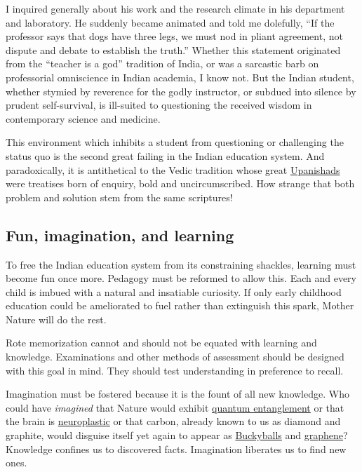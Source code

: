 \documentclass[
  12pt,
  british,
  a4paper,
  rgb,
  dvipsnames,
  svgnames,
  hyphens]{article}
\begin{document}
I inquired generally about his work and the research climate in his
department and laboratory. He suddenly became animated and told me
dolefully, ``If the professor says that dogs have three legs, we must
nod in pliant agreement, not dispute and debate to establish the
truth.'' Whether this statement originated from the ``teacher is a god''
tradition of India, or was a sarcastic barb on professorial omniscience
in Indian academia, I know not. But the Indian student, whether stymied
by reverence for the godly instructor, or subdued into silence by
prudent self-survival, is ill-suited to questioning the received wisdom
in contemporary science and medicine.

This environment which inhibits a student from questioning or
challenging the status quo is the second great failing in the Indian
education system. And paradoxically, it is antithetical to the Vedic
tradition whose great
\href{http://en.wikipedia.org/wiki/Upanishads}{Upanishads} were
treatises born of enquiry, bold and uncircumscribed. How strange that
both problem and solution stem from the same scriptures!

\hypertarget{fun-imagination-and-learning}{%
\subsection{Fun, imagination, and
learning}\label{fun-imagination-and-learning}}

To free the Indian education system from its constraining shackles,
learning must become fun once more. Pedagogy must be reformed to allow
this. Each and every child is imbued with a natural and insatiable
curiosity. If only early childhood education could be ameliorated to
fuel rather than extinguish this spark, Mother Nature will do the rest.

Rote memorization cannot and should not be equated with learning and
knowledge. Examinations and other methods of assessment should be
designed with this goal in mind. They should test understanding in
preference to recall.

Imagination must be fostered because it is the fount of all new
knowledge. Who could have \emph{imagined} that Nature would exhibit
\href{http://www.youtube.com/watch?v=0Eeuqh9QfNI\&list=TLlNpED2t9U9sv5MXb2p3Bdqhg2XFcWnBG}{quantum
entanglement} or that the brain is
\href{http://faculty.washington.edu/chudler/plast.html}{neuroplastic} or
that carbon, already known to us as diamond and graphite, would disguise
itself yet again to appear as
\href{http://en.wikipedia.org/wiki/Bucky_balls}{Buckyballs} and
\href{http://www.graphene.manchester.ac.uk/}{graphene}? Knowledge
confines us to discovered facts. Imagination liberates us to find new
ones.
\end{document}
